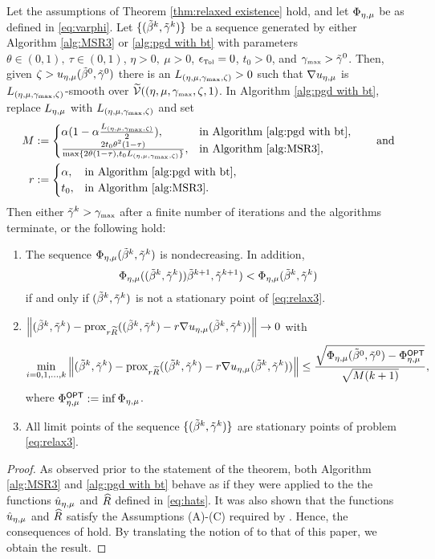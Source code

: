 \begin{theorem}\label{thm:convergence}
Let the assumptions of Theorem \ref{thm:relaxed existence} hold, and
let $\Phi_{\eta,\mu}$ be as defined in \eqref{eq:varphi}. 
Let $\{(\tilde\beta^k,{\tilde{\gamma}}^k)\}$ be a sequence generated
by either Algorithm \ref{alg:MSR3} or \ref{alg:pgd with bt} 
with parameters 
$\theta\in(0,1),\ \tau\in(0,1)$,
$\eta>0,\ \mu>0$, $\epsilon_{\mbox{\tiny Tol}}=0$,
$t_0>0$, and ${\gamma_{\mbox{\tiny max}}}>{\tilde{\gamma}}^0$. 
Then, given $\zeta>{u_{\eta,\mu}}(\tilde\beta^0,{\tilde{\gamma}}^0)$ there is an 
$L_{({\eta,\mu},{\gamma_{\mbox{\tiny max}}},\zeta)}>0$ such that $\nabla{u_{\eta,\mu}}$ is 
$L_{({\eta,\mu},{\gamma_{\mbox{\tiny max}}},\zeta)}$-smooth over 
$\widetilde{{\mathcal{V}}}(({\eta,\mu},{\gamma_{\mbox{\tiny max}}},\zeta,1)$. 
In Algorithm \ref{alg:pgd with bt}, replace 
$L_{\eta,\mu}$ with $L_{({\eta,\mu},{\gamma_{\mbox{\tiny max}}},\zeta)}$ and set
 \[
 \begin{aligned}
 M&:=\begin{cases}
 \alpha(1-\alpha\frac{L_{({\eta,\mu},{\gamma_{\mbox{\tiny max}}},\zeta)}}{2}),&
 \mbox{in Algorithm \ref{alg:pgd with bt}},
 \\
 \frac{2t_0\theta^2(1-\tau)}{\max\{2\theta(1-\tau),t_0L_{({\eta,\mu},{\gamma_{\mbox{\tiny max}}},\zeta)}\}},&
 \mbox{in Algorithm \ref{alg:MSR3}},
 \end{cases}
 \qquad\text{and}
 \\
 r&:=
 \begin{cases}
 \alpha,&
 \mbox{in Algorithm \ref{alg:pgd with bt}},
 \\
t_0,&
 \mbox{in Algorithm \ref{alg:MSR3}}.
 \end{cases}
 \end{aligned}\]
Then either ${\tilde{\gamma}}^k>{\gamma_{\mbox{\tiny max}}}$ after a finite number of iterations and the algorithms terminate, or the 
following hold:
\begin{enumerate}
\item
The sequence $\Phi_{\eta,\mu}(\tilde\beta^k,{\tilde{\gamma}}^k)$ is nondecreasing.
In addition, \[\Phi_{\eta,\mu}((\tilde\beta^k,{\tilde{\gamma}}^k))\tilde\beta^{k+1},{\tilde{\gamma}}^{k+1})<\Phi_{\eta,\mu}(\tilde\beta^k,{\tilde{\gamma}}^k)\]
if and only if $(\tilde\beta^k,{\tilde{\gamma}}^k)$ is not a stationary point of \eqref{eq:relax3}.
\item
$\left\Vert (\tilde\beta^k,{\tilde{\gamma}}^k)-{\mathrm{prox}}_{r{\widetilde R}}((\tilde\beta^k,{\tilde{\gamma}}^k)-r\nabla u_{\eta,\mu}(\tilde\beta^k,{\tilde{\gamma}}^k))\right\Vert\rightarrow 0$ with
\[
\min_{i=0,1,\dots,k}\left\Vert (\tilde\beta^k,{\tilde{\gamma}}^k)-{\mathrm{prox}}_{r{\widetilde R}}((\tilde\beta^k,{\tilde{\gamma}}^k)-r\nabla u_{\eta,\mu}(\tilde\beta^k,{\tilde{\gamma}}^k))\right\Vert
\le \frac{\sqrt{\Phi_{\eta,\mu}(\tilde\beta^0,{\tilde{\gamma}}^0)-\Phi_{\eta,\mu}^\mathsf{OPT}}}
{\sqrt{M(k+1)}},
\]
where $\Phi_{\eta,\mu}^\mathsf{OPT}:=\inf \Phi_{\eta,\mu}$.
\item
All limit points of the sequence $\{(\tilde\beta^k,{\tilde{\gamma}}^k)\}$ are stationary points of
problem \eqref{eq:relax3}.
\end{enumerate}
\end{theorem}
\begin{proof}
As observed prior to the statement of the theorem, 
both Algorithm \ref{alg:MSR3} and \ref{alg:pgd with bt}
behave as if they were applied to the the functions 
$\hat u_{\eta,\mu}$ and ${\widehat R}$ defined in \eqref{eq:hats}. 
It was also shown that the functions $\hat u_{\eta,\mu}$ and ${\widehat R}$
satisfy the Assumptions (A)-(C) required by \cite[Theorem 10.15]{AB17}.
Hence, the consequences of \cite[Theorem 10.15]{AB17} hold.
By translating the notion of \cite[Theorem 10.15]{AB17} to that of this paper,
we obtain the result.
\end{proof}

